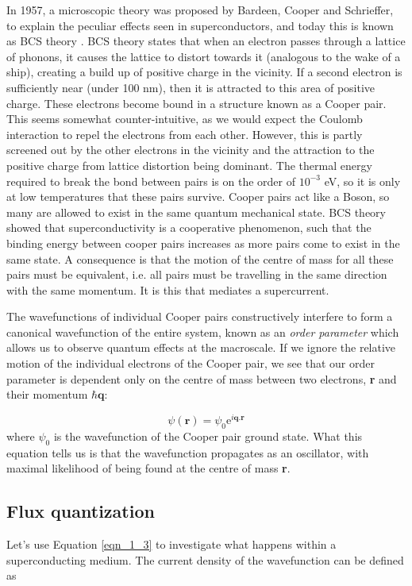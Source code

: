 In 1957, a microscopic theory was proposed by Bardeen, Cooper and Schrieffer, to explain the peculiar effects seen in superconductors, and today this is known as BCS theory \citep{Bardeen1957}. BCS theory states that when an electron passes through a lattice of phonons, it causes the lattice to distort towards it (analogous to the wake of a ship), creating a build up of positive charge in the vicinity. If a second electron is sufficiently near (under 100 nm), then it is attracted to this area of positive charge. These electrons become bound in a structure known as a Cooper pair. This seems somewhat counter-intuitive, as we would expect the Coulomb interaction to repel the electrons from each other. However, this is partly screened out by the other electrons in the vicinity and the attraction to the positive charge from lattice distortion being dominant. The thermal energy required to break the bond between pairs is on the order of $10^{-3}$ eV, so it is only at low temperatures that these pairs survive. Cooper pairs act like a Boson, so many are allowed to exist in the same quantum mechanical state. BCS theory showed that superconductivity is a cooperative phenomenon, such that the binding energy between cooper pairs increases as more pairs come to exist in the same state. A consequence is that the motion of the centre of mass for all these pairs must be equivalent, i.e. all pairs must be travelling in the same direction with the same momentum. It is this that mediates a supercurrent.

The wavefunctions of individual Cooper pairs constructively interfere to form a canonical wavefunction of the entire system, known as an \textit{order parameter} which allows us to observe quantum effects at the macroscale. If we ignore the relative motion of the individual electrons of the Cooper pair, we see that our order parameter is dependent only on the centre of mass between two electrons, \textbf{r} and their momentum $\hbar\mathbf{q}$:

\begin{equation}
\psi(\mathbf{r})=\psi_0\text{e}^{i\mathbf{q}.\mathbf{r}} \label{eqn_1_3}
\end{equation} where $\psi_0$ is the wavefunction of the Cooper pair ground state. What this equation tells us is that the wavefunction propagates as an oscillator, with maximal likelihood of being found at the centre of mass \textbf{r}.

\subsection{Flux quantization}
Let's use Equation \ref{eqn_1_3} to investigate what happens within a superconducting medium. The current density of the wavefunction can be defined as \citep{London1948,Hook1991}


